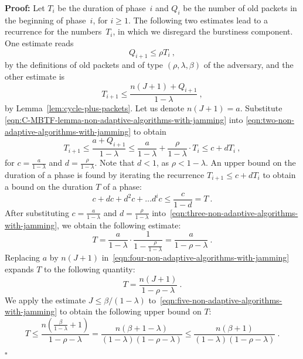 \documentclass[11pt]{article}
\newcommand{\qed}{\hfill $\square$}
\newenvironment{proof}{\noindent\textbf{Proof: }}{\qed \smallbreak}
\begin{document}
\begin{proof}
Let $T_i$ be the duration of phase~$i$ and $Q_i$ be the number of old packets in the beginning of phase~$i$, for $i\ge 1$.
The following two estimates lead to a recurrence for the numbers~$T_i$, in which we disregard the burstiness component.
One estimate reads  
\begin{equation}
\label{eqn:C-MBTF-lemma-non-adaptive-algorithms-with-jamming}
Q_{i+1}\le \rho T_i \ , 
\end{equation}
by the definitions of old packets and of type $(\rho,\lambda,\beta)$ of the adversary, and the other estimate is 
\begin{equation}
\label{eqn:two-non-adaptive-algorithms-with-jamming}
T_{i+1}\le \frac{n(J+1)+Q_{i+1}}{1-\lambda} \ ,
\end{equation}
by Lemma~\ref{lem:cycle-plus-packets}.  
Let us denote $n(J+1)=a$.
Substitute \eqref{eqn:C-MBTF-lemma-non-adaptive-algorithms-with-jamming} into \eqref{eqn:two-non-adaptive-algorithms-with-jamming} to obtain
\[
T_{i+1} 
\le
\frac{a + Q_{i+1}}{1-\lambda} 
\le 
\frac{a}{1-\lambda}+ \frac{\rho }{1-\lambda}  \cdot T_i
\le c + d T_i
\ ,
\]
for $c=\frac{a}{1-\lambda}$ and $d=\frac{\rho}{1-\lambda}$.
Note that $d < 1$, as $\rho<1-\lambda$.
An upper bound on the duration of a phase is found by iterating the recurrence $T_{i+1}\le c + d T_i$ to obtain a bound on the duration $T$ of a phase:
\begin{equation}
\label{eqn:three-non-adaptive-algorithms-with-jamming}
c+d c + d^2 c +\ldots d^i c\le \frac{c}{1-d}=T\ .
\end{equation}
After substituting $c=\frac{a}{1-\lambda}$ and $d=\frac{\rho}{1-\lambda}$ into~\eqref{eqn:three-non-adaptive-algorithms-with-jamming}, we obtain the following estimate:
\begin{equation}
\label{eqn:four-non-adaptive-algorithms-with-jamming}
T =
\frac{a}{1-\lambda} \cdot \frac{1}{1-\frac{\rho}{1-\lambda}}
=
\frac{a}{1-\rho-\lambda} \ .
\end{equation}
Replacing $a$ by $n(J+1)$ in~\eqref{eqn:four-non-adaptive-algorithms-with-jamming}  expands $T$ to the following quantity:
\begin{equation}
\label{eqn:five-non-adaptive-algorithms-with-jamming}
T =
\frac{n(J+1)}{1-\rho-\lambda} \ .
\end{equation}
We apply the estimate $J\le \beta/(1-\lambda)$ to~\eqref{eqn:five-non-adaptive-algorithms-with-jamming} to obtain the following upper bound on $T$:
\begin{equation}
\label{eqn:nine-non-adaptive-algorithms-with-jamming}
T \le 
\frac{n(\frac{\beta}{1-\lambda}+1)}{1-\rho-\lambda}
=
\frac{n(\beta+1-\lambda)}{(1-\lambda)(1-\rho-\lambda)}
\le
\frac{n(\beta+1)}{(1-\lambda)(1-\rho-\lambda)} \ .
\end{equation}


\end{proof}
\end{document}
